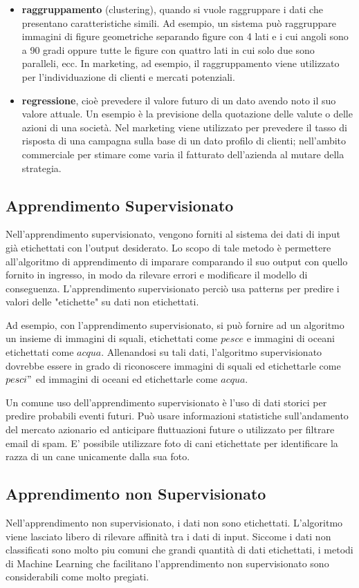 \begin{itemize}
\item \textbf{raggruppamento} (clustering), quando si vuole raggruppare i dati che presentano caratteristiche simili. Ad esempio, un sistema può raggruppare immagini di figure geometriche separando figure con 4 lati e i cui angoli sono a 90 gradi oppure tutte le figure con quattro lati in cui solo due sono paralleli, ecc. In marketing, ad esempio, il raggruppamento viene utilizzato per l'individuazione di clienti e mercati potenziali.
\item \textbf{regressione}, cioè prevedere il valore futuro di un dato avendo noto il suo valore attuale. Un esempio è la previsione della quotazione delle valute o delle azioni di una società. Nel marketing viene utilizzato per prevedere il tasso di risposta di una campagna sulla base di un dato profilo di clienti; nell'ambito commerciale per stimare come varia il fatturato dell'azienda al mutare della strategia.
\end{itemize}

\subsection{Apprendimento Supervisionato}
Nell'apprendimento supervisionato, vengono forniti al sistema dei dati di input già etichettati con l'output desiderato. Lo scopo di tale metodo è permettere all'algoritmo di apprendimento di imparare comparando il suo output con quello fornito in ingresso, in modo da rilevare errori e modificare il modello di conseguenza. L'apprendimento supervisionato perciò usa patterns per predire i valori delle "etichette" su dati non etichettati.

Ad esempio, con l'apprendimento supervisionato, si può fornire ad un algoritmo un insieme di immagini di squali, etichettati come $pesce$ e immagini di oceani etichettati come $acqua$. Allenandosi su tali dati, l'algoritmo supervisionato dovrebbe essere in grado di riconoscere immagini di squali ed etichettarle come $pesci"$ ed immagini di oceani ed etichettarle come $acqua$.

Un comune uso dell'apprendimento supervisionato è l'uso di dati storici per predire probabili eventi futuri. Può usare informazioni statistiche sull'andamento del mercato azionario ed anticipare fluttuazioni future o utilizzato per filtrare email di spam. E' possibile utilizzare foto di cani etichettate per identificare la razza di un cane unicamente dalla sua foto.

\subsection{Apprendimento non Supervisionato}
Nell'apprendimento non supervisionato, i dati non sono etichettati. L'algoritmo viene lasciato libero di rilevare affinità tra i dati di input. Siccome i dati non classificati sono molto piu comuni che grandi quantità di dati etichettati, i metodi di Machine Learning che facilitano l'apprendimento non supervisionato sono considerabili come molto pregiati.

